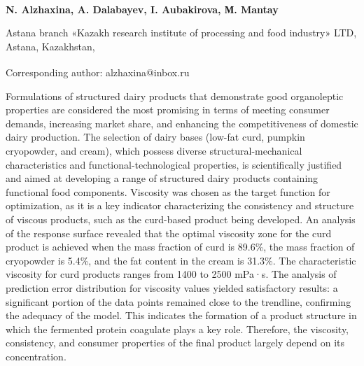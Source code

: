 \vspace{0.5em}
\begin{articleheader}

{\bfseries
N. Alzhaxina\textsuperscript{\envelope },
A. Dalabayev,
I. Aubakirova,
М. Mantay
}
\end{articleheader}

\begin{affiliation}
Astana branch «Kazakh research institute of processing and food industry» LTD, Astana, Kazakhstan,

\raggedright \textsuperscript{\envelope }Corresponding author: alzhaxina@inbox.ru
\end{affiliation}

Formulations of structured dairy products that demonstrate good
organoleptic properties are considered the most promising in terms of
meeting consumer demands, increasing market share, and enhancing the
competitiveness of domestic dairy production. The selection of dairy
bases (low-fat curd, pumpkin cryopowder, and cream), which possess
diverse structural-mechanical characteristics and
functional-tech\-nological properties, is scientifically justified and
aimed at developing a range of structured dairy products containing
functional food components. Viscosity was chosen as the target function
for optimization, as it is a key indicator characterizing the
consistency and structure of viscous products, such as the curd-based
product being developed. An analysis of the response surface revealed
that the optimal viscosity zone for the curd product is achieved when
the mass fraction of curd is 89.6\%, the mass fraction of cryopowder is
5.4\%, and the fat content in the cream is 31.3\%. The characteristic
viscosity for curd products ranges from 1400 to 2500 mPa·s. The analysis
of prediction error distribution for viscosity values yielded
satisfactory results: a significant portion of the data points remained
close to the trendline, confirming the adequacy of the model. This
indicates the formation of a product structure in which the fermented
protein coagulate plays a key role. Therefore, the viscosity,
consistency, and consumer properties of the final product largely depend
on its concentration.

